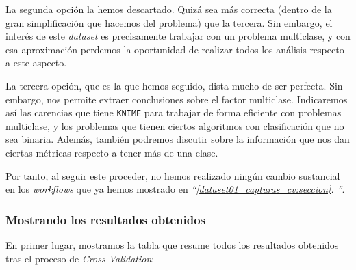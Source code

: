 \documentclass[11pt]{article}
\newcommand{\customcite}[1]{\emph{``\ref{#1}. \nameref{#1}''}}
\begin{document}
La segunda opción la hemos descartado. Quizá sea más correcta (dentro de la gran simplificación que hacemos del problema) que la tercera. Sin embargo, el interés de este \emph{dataset} es precisamente trabajar con un problema multiclase, y con esa aproximación perdemos la oportunidad de realizar todos los análisis respecto a este aspecto.

La tercera opción, que es la que hemos seguido, dista mucho de ser perfecta. Sin embargo, nos permite extraer conclusiones sobre el factor multiclase. Indicaremos así las carencias que tiene \lstinline{KNIME} para trabajar de forma eficiente con problemas multiclase, y los problemas que tienen ciertos algoritmos con clasificación que no sea binaria. Además, también podremos discutir sobre la información que nos dan ciertas métricas respecto a tener más de una clase.

Por tanto, al seguir este proceder, no hemos realizado ningún cambio sustancial en los \emph{workflows} que ya hemos mostrado en \customcite{dataset01_capturas_cv:seccion}.

\pagebreak

\subsubsection{Mostrando los resultados obtenidos}

En primer lugar, mostramos la tabla que resume todos los resultados obtenidos tras el proceso de \emph{Cross Validation}:

\begin{table}[H]
\begin{center}
\end{center}
    \caption{Resultados de \emph{Cross Validation}, para los distintos algoritmos estudiados, en el segundo \emph{dataset}}
\end{table}
\end{document}
